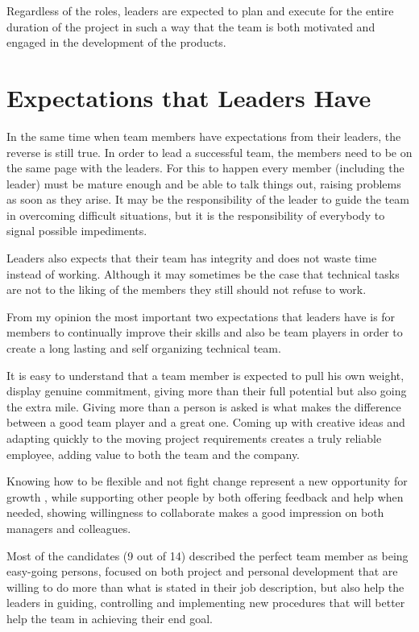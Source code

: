 Regardless of the roles, leaders are expected to plan and execute for the entire duration of the project in such a way that the team is both motivated and engaged in the development of the products.

\section{Expectations that Leaders Have}
\label{sec:byleaders}
In the same time when team members have expectations from their leaders, the reverse is still true. In order to lead a successful team, the members need to be on the same page with the leaders. For this to happen every member (including the leader) must be mature enough and be able to talk things out, raising problems as soon as they arise. It may be the responsibility of the leader to guide the team in overcoming difficult situations, but it is the responsibility of everybody to signal possible impediments.

Leaders also expects that their team has integrity and does not waste time instead of working. Although it may sometimes be the case that technical tasks are not to the liking of the members they still should not refuse to work. 

From my opinion the most important two expectations that leaders have is for members to continually improve their skills and also be team players in order to create a long lasting and self organizing technical team.

It is easy to understand that a team member is expected to pull his own weight, display genuine commitment, giving more than their full potential but also going the extra mile. Giving more than a person is asked is what makes the difference between a good team player and a great one. Coming up with creative ideas and adapting quickly to the moving project requirements creates a truly reliable employee, adding value to both the team and the company.

Knowing how to be flexible and not fight change represent a new opportunity for growth , while supporting other people by both offering feedback and help when needed, showing willingness to collaborate makes a good impression on both managers and colleagues.

Most of the candidates (9 out of 14) described the perfect team member as being easy-going persons, focused on both project and personal development that are willing to do more than what is stated in their job description, but also help the leaders in guiding, controlling and implementing new procedures that will better help the team in achieving their end goal.

